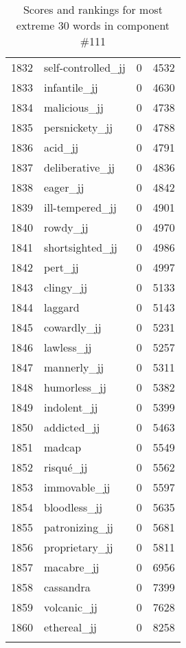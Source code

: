 \begin{longtable}[!htbp]{| rlr@{.}l |}
    1832 & self-controlled\_jj & 0 & 4532 \\
    1833 & infantile\_jj & 0 & 4630 \\
    1834 & malicious\_jj & 0 & 4738 \\
    1835 & persnickety\_jj & 0 & 4788 \\
    1836 & acid\_jj & 0 & 4791 \\
    1837 & deliberative\_jj & 0 & 4836 \\
    1838 & eager\_jj & 0 & 4842 \\
    1839 & ill-tempered\_jj & 0 & 4901 \\
    1840 & rowdy\_jj & 0 & 4970 \\
    1841 & shortsighted\_jj & 0 & 4986 \\
    1842 & pert\_jj & 0 & 4997 \\
    1843 & clingy\_jj & 0 & 5133 \\
    1844 & laggard & 0 & 5143 \\
    1845 & cowardly\_jj & 0 & 5231 \\
    1846 & lawless\_jj & 0 & 5257 \\
    1847 & mannerly\_jj & 0 & 5311 \\
    1848 & humorless\_jj & 0 & 5382 \\
    1849 & indolent\_jj & 0 & 5399 \\
    1850 & addicted\_jj & 0 & 5463 \\
    1851 & madcap & 0 & 5549 \\
    1852 & risqué\_jj & 0 & 5562 \\
    1853 & immovable\_jj & 0 & 5597 \\
    1854 & bloodless\_jj & 0 & 5635 \\
    1855 & patronizing\_jj & 0 & 5681 \\
    1856 & proprietary\_jj & 0 & 5811 \\
    1857 & macabre\_jj & 0 & 6956 \\
    1858 & cassandra & 0 & 7399 \\
    1859 & volcanic\_jj & 0 & 7628 \\
    1860 & ethereal\_jj & 0 & 8258 \\
    \hline
    \caption{Scores and rankings for most extreme 30 words in component \#111} \\
\end{longtable}
